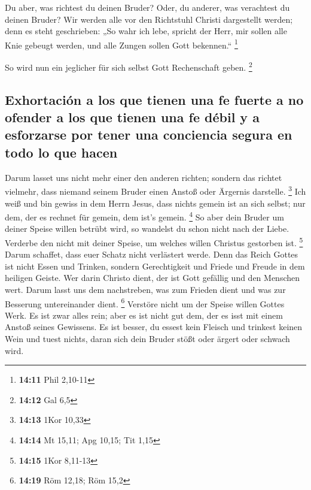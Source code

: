  Du aber, was richtest du deinen Bruder? Oder, du
anderer, was verachtest du deinen Bruder? Wir werden alle vor den
Richtstuhl Christi dargestellt werden;  denn es steht
geschrieben: „So wahr ich lebe, spricht der Herr, mir sollen alle Knie
gebeugt werden, und alle Zungen sollen Gott bekennen.`` \footnote{\textbf{14:11}
  Phil 2,10-11}

 So wird nun ein jeglicher für sich selbst Gott
Rechenschaft geben. \footnote{\textbf{14:12} Gal 6,5}

\hypertarget{exhortaciuxf3n-a-los-que-tienen-una-fe-fuerte-a-no-ofender-a-los-que-tienen-una-fe-duxe9bil-y-a-esforzarse-por-tener-una-conciencia-segura-en-todo-lo-que-hacen}{%
\subsection{Exhortación a los que tienen una fe fuerte a no ofender a
los que tienen una fe débil y a esforzarse por tener una conciencia
segura en todo lo que
hacen}\label{exhortaciuxf3n-a-los-que-tienen-una-fe-fuerte-a-no-ofender-a-los-que-tienen-una-fe-duxe9bil-y-a-esforzarse-por-tener-una-conciencia-segura-en-todo-lo-que-hacen}}

 Darum lasset uns nicht mehr einer den anderen richten;
sondern das richtet vielmehr, dass niemand seinem Bruder einen Anstoß
oder Ärgernis darstelle. \footnote{\textbf{14:13} 1Kor 10,33}
 Ich weiß und bin gewiss in dem Herrn Jesus, dass nichts
gemein ist an sich selbst; nur dem, der es rechnet für gemein, dem ist's
gemein. \footnote{\textbf{14:14} Mt 15,11; Apg 10,15; Tit 1,15}
 So aber dein Bruder um deiner Speise willen betrübt
wird, so wandelst du schon nicht nach der Liebe. Verderbe den nicht mit
deiner Speise, um welches willen Christus gestorben ist. \footnote{\textbf{14:15}
  1Kor 8,11-13}  Darum schaffet, dass euer Schatz nicht
verlästert werde.  Denn das Reich Gottes ist nicht Essen
und Trinken, sondern Gerechtigkeit und Friede und Freude in dem heiligen
Geiste.  Wer darin Christo dient, der ist Gott gefällig
und den Menschen wert.  Darum lasst uns dem nachstreben,
was zum Frieden dient und was zur Besserung untereinander dient.
\footnote{\textbf{14:19} Röm 12,18; Röm 15,2}  Verstöre
nicht um der Speise willen Gottes Werk. Es ist zwar alles rein; aber es
ist nicht gut dem, der es isst mit einem Anstoß seines Gewissens.
 Es ist besser, du essest kein Fleisch und trinkest
keinen Wein und tuest nichts, daran sich dein Bruder stößt oder ärgert
oder schwach wird.

